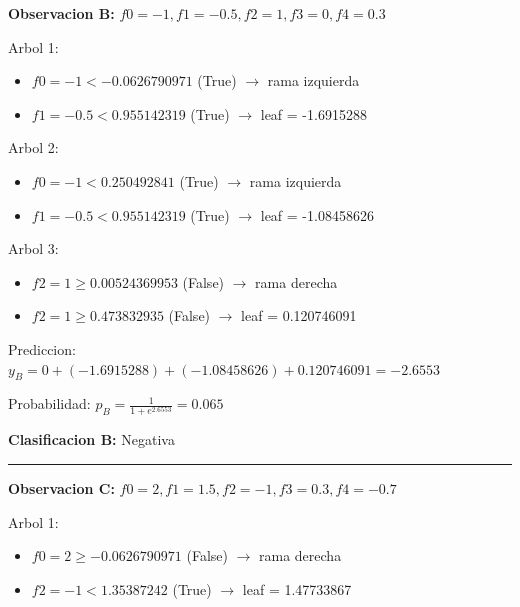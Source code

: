 \documentclass[12pt]{article}
\begin{document}
\vspace{1em}

\textbf{Observacion B: } $f0 = -1, f1 = -0.5, f2 = 1, f3 = 0, f4 = 0.3$

\vspace{0.5em}

Arbol 1:
\begin{itemize}
    \item $f0 = -1 < -0.0626790971$ (True) $\rightarrow$ rama izquierda
    \item $f1 = -0.5 < 0.955142319$ (True) $\rightarrow$ leaf = -1.6915288
\end{itemize}

Arbol 2:
\begin{itemize}
    \item $f0 = -1 < 0.250492841$ (True) $\rightarrow$ rama izquierda
    \item $f1 = -0.5 < 0.955142319$ (True) $\rightarrow$ leaf = -1.08458626
\end{itemize}

Arbol 3:
\begin{itemize}
    \item $f2 = 1 \geq 0.00524369953$ (False) $\rightarrow$ rama derecha
    \item $f2 = 1 \geq 0.473832935$ (False) $\rightarrow$ leaf = 0.120746091
\end{itemize}

Prediccion: $y_B = 0 + (-1.6915288) + (-1.08458626) + 0.120746091 = -2.6553$

\vspace{1em}

Probabilidad: $p_B = \frac{1}{1 + e^{2.6553}} = 0.065$

\vspace{1em}

\textbf{Clasificacion B: } Negativa

\vspace{1em}

\noindent\rule{\textwidth}{0.4pt}

\vspace{1em}

\textbf{Observacion C: } $f0 = 2, f1 = 1.5, f2 = -1, f3 = 0.3, f4 = -0.7$

\vspace{0.5em}

Arbol 1:
\begin{itemize}
    \item $f0 = 2 \geq -0.0626790971$ (False) $\rightarrow$ rama derecha
    \item $f2 = -1 < 1.35387242$ (True) $\rightarrow$ leaf = 1.47733867
\end{itemize}
\end{document}
